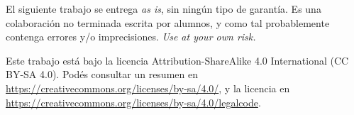 El siguiente trabajo se entrega \emph{as is}, sin ningún tipo de garantía. Es una colaboración no terminada escrita por alumnos, y como tal probablemente contenga errores y/o imprecisiones. \emph{Use at your own risk.}

Este trabajo está bajo la licencia Attribution-ShareAlike 4.0 International (CC BY-SA 4.0). Podés consultar un resumen en \url{https://creativecommons.org/licenses/by-sa/4.0/}, y la licencia en \url{https://creativecommons.org/licenses/by-sa/4.0/legalcode}.